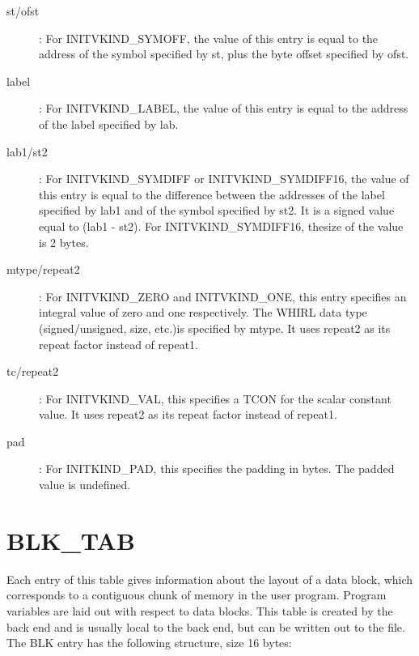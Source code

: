 \begin{description}
\item[st/ofst]: For INITVKIND\_SYMOFF, the value of this entry is equal
  to the address of the symbol specified by st, plus the byte offset
  specified by ofst.

\item[label]: For INITVKIND\_LABEL, the value of this entry is equal to
  the address of the label specified by lab.

\item[lab1/st2]: For
%
INITVKIND\_SYMDIFF or INITVKIND\_SYMDIFF16, the
  value of this entry is equal to the difference between the addresses
  of the label specified by lab1  and of the symbol specified by st2. It
  is a signed value equal to (lab1 - st2). For INITVKIND\_SYMDIFF16,
  thesize of the value is 2 bytes.

\item[mtype/repeat2]: For
%
INITVKIND\_ZERO and INITVKIND\_ONE, this
  entry specifies an integral value of zero and one respectively. The
  WHIRL data type (signed/unsigned, size, etc.)is specified by
  mtype. It uses repeat2 as its repeat factor instead of repeat1.

\item[tc/repeat2]: For INITVKIND\_VAL, this specifies a
%
TCON for the
  scalar constant value. It uses repeat2 as its repeat factor instead
  of repeat1.

\item[pad]: For INITKIND\_PAD, this specifies the padding in bytes. The
  padded value is undefined.
\end{description}

\section{BLK\_TAB}

Each entry of this table gives information about the layout of a
data block, which corresponds to a contiguous chunk of memory in the
user program. Program variables are laid out with respect to data
blocks. This table is created by the back end and is usually local to
the back end, but can be written out to the file. The
%
BLK entry has
the following structure, size 16 bytes:

